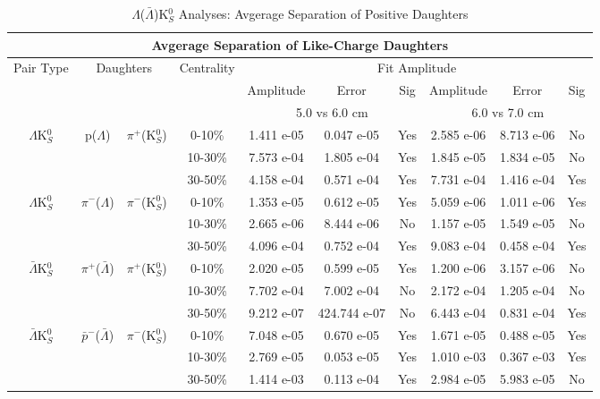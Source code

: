 \documentclass[../AnalysisNoteJBuxton.tex]{subfiles}
\begin{document}
\begin{table}
 \centering
 \begin{tabular}{|c|c|c|c|c|c|c||c|c|c|}
 \multicolumn{10}{c}{Avgerage Separation of Like-Charge Daughters} \\
  \hline
  \multirow{3}{*}{Pair Type} & \multicolumn{2}{c|}{\multirow{3}{*}{Daughters}} & \multirow{3}{*}{Centrality} & \multicolumn{6}{c|}{Fit Amplitude} \\
  \cline{5-10}
   & \multicolumn{2}{c|}{} & & Amplitude & Error & Sig & Amplitude & Error & Sig \\  
  \cline{5-10}
   & \multicolumn{2}{c|}{} & & \multicolumn{3}{c||}{5.0 vs 6.0 cm} & \multicolumn{3}{c|}{6.0 vs 7.0 cm} \\  
  \hline
  \multirow{3}{*}{$\Lambda$K$^{0}_{S}$} & \multirow{3}{*}{p($\Lambda$)} & \multirow{3}{*}{$\pi^{+}$(K$^{0}_{S}$)}
   &      0-10\% & 1.411 e-05 & 0.047 e-05 & Yes & 2.585 e-06 & 8.713 e-06 & No \\
   & & & 10-30\% & 7.573 e-04 & 1.805 e-04 & Yes & 1.845 e-05 & 1.834 e-05 & No \\
   & & & 30-50\% & 4.158 e-04 & 0.571 e-04 & Yes & 7.731 e-04 & 1.416 e-04 & Yes \\
  \hline
  \multirow{3}{*}{$\Lambda$K$^{0}_{S}$} & \multirow{3}{*}{$\pi^{-}$($\Lambda$)} & \multirow{3}{*}{$\pi^{-}$(K$^{0}_{S}$) }
   &      0-10\% & 1.353 e-05 & 0.612 e-05 & Yes & 5.059 e-06 & 1.011 e-06 & Yes \\
   & & & 10-30\% & 2.665 e-06 & 8.444 e-06 & No & 1.157 e-05 & 1.549 e-05 & No \\
   & & & 30-50\% & 4.096 e-04 & 0.752 e-04 & Yes & 9.083 e-04 & 0.458 e-04 & Yes \\
  \hline \hline
  \multirow{3}{*}{$\bar{\Lambda}$K$^{0}_{S}$} & \multirow{3}{*}{$\pi^{+}$($\bar{\Lambda}$)} & \multirow{3}{*}{$\pi^{+}$(K$^{0}_{S}$)} 
   &      0-10\% & 2.020 e-05 & 0.599 e-05 & Yes & 1.200 e-06 & 3.157 e-06 & No \\ 
   & & & 10-30\% & 7.702 e-04 & 7.002 e-04 & No & 2.172 e-04 & 1.205 e-04 & No \\
   & & & 30-50\% & 9.212 e-07 & 424.744 e-07 & No & 6.443 e-04 & 0.831 e-04 & Yes \\
  \hline
  \multirow{3}{*}{$\bar{\Lambda}$K$^{0}_{S}$} & \multirow{3}{*}{$\bar{p}^{-}$($\bar{\Lambda}$)} & \multirow{3}{*}{$\pi^{-}$(K$^{0}_{S}$)}
   &      0-10\% & 7.048 e-05 & 0.670 e-05 & Yes & 1.671 e-05 & 0.488 e-05 & Yes \\
   & & & 10-30\% & 2.769 e-05 & 0.053 e-05 & Yes & 1.010 e-03 & 0.367 e-03 & Yes \\
   & & & 30-50\% & 1.414 e-03 & 0.113 e-04 & Yes & 2.984 e-05 & 5.983 e-05 & No \\
  \hline
 \end{tabular}
 \caption{$\Lambda$($\bar{\Lambda}$)K$^{0}_{S}$ Analyses: Avgerage Separation of Positive Daughters}
 \label{tab:AvgSepLamK0}
\end{table}
\end{document}

